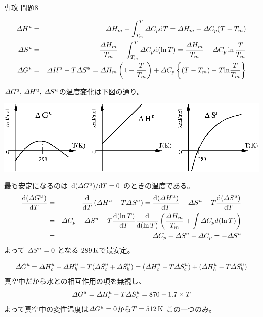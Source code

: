 \documentclass[fleqn]{jbook}
\begin{document}
\begin{answer}{専攻 問題8}{}

\begin{subanswers}
\SubAnswer
  \vspace*{-5mm}
  \begin{eqnarray*}
  \IDelta H^u &=&%
     \IDelta H_m + \int_{T_m}^{T}\IDelta C_p \d{T}  
     = \IDelta H_m + \IDelta C_p(T-T_m)\\
  \IDelta S^u &=&%
    \frac{\IDelta H_m}{T_m} + \int_{T_m}^{T}\IDelta C_p \d{(\ln{T})}
    = \frac{\IDelta H_m }{T_m} + \IDelta C_p \ln{\frac{T}{T_m}}\\
  \IDelta G^u &=&%
    \IDelta H^u -T \IDelta S^u%
    = \IDelta H_m \left( 1- \frac{T}{T_m} \right)%
    + \IDelta C_p %
      \left\{ \left(T-T_m \right) - T {\rm ln}\frac{T}{T_m} \right\}%
  \end{eqnarray*}

\SubAnswer
  ${\mit\Delta} G^u,\,{\mit\Delta} H^u,\,{\mit\Delta} S^u$の温度変化は下図の通り。
%
  \begin{center}
    \mbox{\includegraphics[clip]{1996phy8-3.eps}}
  \end{center}
%
  最も安定になるのは ${\rm d} ({\mit\Delta} G^u) / {\rm d} T = 0 $
  のときの温度である。
%
  \begin{eqnarray*}
    \Deriver{(\IDelta G^u)}{T}%
    &=& \Deriver{}{T}\left( \IDelta H^u -T\IDelta S^u \right)%
     =  \Deriver{(\IDelta H^u)}{T}- \IDelta S^u%
        - T \Deriver{(\IDelta S^u)}{T} \\
    &=& \IDelta C_p - \IDelta S^u%
        - T \Deriver{(\ln{T})}{T}\Deriver{}{(\ln{T})}%
        \left( \frac{\IDelta H_m}{T_m}
        + \int \IDelta C_p d(\ln{T}) \right) \\
    &=& \IDelta C_p - \IDelta S^u - \IDelta C_p 
     =  - \IDelta S^u
  \end{eqnarray*}
%
  よって ${\mit\Delta} S^u =0$ となる $289\,{\rm K}$で最安定。



\SubAnswer
  \[ {\mit\Delta} G^u = {\mit\Delta} H^u_c + {\mit\Delta} H^u_h
     - T({\mit\Delta} S^u_c + {\mit\Delta} S^u_h )
     = ({\mit\Delta} H^u_c - T {\mit\Delta} S^u_c )
     +({\mit\Delta} H^u_h - T {\mit\Delta} S^u_h ) \]
%
  真空中だから水との相互作用の項を無視し、
%
  \[ {\mit\Delta} G^u = {\mit\Delta} H^u_c - T {\mit\Delta} S^u_c 
     = 870 - 1.7 \times T \]
%
  よって真空中の変性温度は${\mit\Delta} G^u =0$から$T=512\,{\rm K}$
  この一つのみ。


\end{subanswers}
\end{answer}
\end{document}
